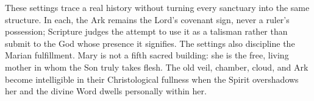 These settings trace a real history without turning every sanctuary into the
same structure.  In each, the Ark remains the Lord's covenant sign, never a
ruler's possession; Scripture judges the attempt to use it as a talisman
rather than submit to the God whose presence it signifies.  The settings also
discipline the Marian fulfillment.  Mary is not a
fifth sacred building: she is the free, living mother in whom the Son truly
takes flesh.  The old veil, chamber, cloud, and Ark become intelligible in
their Christological fullness when the Spirit overshadows her and the divine
Word dwells personally within her.
